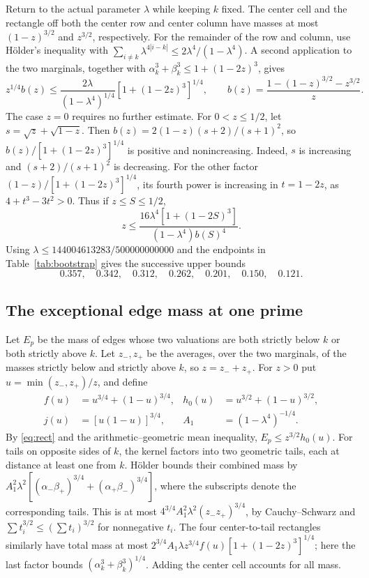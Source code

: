 \documentclass[11pt,a4paper]{article}
\begin{document}
Return to the actual parameter \(\lambda\) while keeping \(k\) fixed.
The center cell and the rectangle off both the center row and center
column have masses at most \((1-z)^{3/2}\) and \(z^{3/2}\), respectively.
For the remainder of the row and column, use H\"older's inequality
with \(\sum_{i\ne k}\lambda^{4|i-k|}\le2\lambda^4/(1-\lambda^4)\).
A second application to the two marginals, together with
\(\alpha_k^3+\beta_k^3\le1+(1-2z)^3\), gives
\[
 z^{1/4}b(z)\le
  \frac{2\lambda}{(1-\lambda^4)^{1/4}}[1+(1-2z)^3]^{1/4},
 \qquad b(z)=\frac{1-(1-z)^{3/2}-z^{3/2}}{z}.
\]
The case \(z=0\) requires no further estimate.
For \(0<z\le1/2\), let \(s=\sqrt z+\sqrt{1-z}\). Then
\(b(z)=2(1-z)(s+2)/(s+1)^2\), so \(b(z)/[1+(1-2z)^3]^{1/4}\)
is positive and nonincreasing. Indeed, \(s\) is increasing and
\((s+2)/(s+1)^2\) is decreasing. For the other factor
\((1-z)/[1+(1-2z)^3]^{1/4}\), its fourth power is increasing in
\(t=1-2z\), as \(4+t^3-3t^2>0\). Thus if \(z\le S\le1/2\),
\[
 z\le \frac{16\lambda^4[1+(1-2S)^3]}{(1-\lambda^4)b(S)^4}.
\]
Using \(\lambda\le144004613283/500000000000\) and the endpoints in
Table~\ref{tab:bootstrap} gives the successive upper bounds
\[
 0.357,\quad 0.342,\quad 0.312,\quad 0.262,\quad
 0.201,\quad 0.150,\quad 0.121.
\]

\subsection{The exceptional edge mass at one prime}

Let \(E_p\) be the mass of edges whose two valuations are both
strictly below \(k\) or both strictly above \(k\). Let \(z_-,z_+\)
be the averages, over the two marginals, of the masses strictly
below and strictly above \(k\), so \(z=z_-+z_+\). For \(z>0\) put
\(u=\min(z_-,z_+)/z\), and define
\[
 \begin{aligned}
 f(u)&=u^{3/4}+(1-u)^{3/4},&
 h_0(u)&=u^{3/2}+(1-u)^{3/2},\\
 j(u)&=[u(1-u)]^{3/4},&
 A_1&=(1-\lambda^4)^{-1/4}.
 \end{aligned}
\]
By \eqref{eq:rect} and the arithmetic--geometric mean inequality,
\(E_p\le z^{3/2}h_0(u)\). For tails on opposite sides of \(k\),
the kernel factors into two geometric tails, each at distance at
least one from \(k\). H\"older bounds their combined mass by
\(A_1^2\lambda^2[(\alpha_-\beta_+)^{3/4}+(\alpha_+\beta_-)^{3/4}]\),
where the subscripts denote the corresponding tails. This is at most
\(4^{3/4}A_1^2\lambda^2(z_-z_+)^{3/4}\), by Cauchy--Schwarz and
\(\sum t_i^{3/2}\le(\sum t_i)^{3/2}\) for nonnegative \(t_i\).
The four center-to-tail rectangles similarly have total mass at most
\(2^{3/4}A_1\lambda z^{3/4} f(u)[1+(1-2z)^3]^{1/4}\);
here the last factor bounds \((\alpha_k^3+\beta_k^3)^{1/4}\).
Adding the center cell accounts for all mass.
\end{document}
